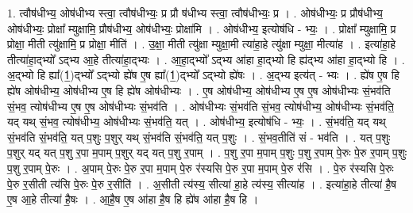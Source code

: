 \documentclass[17pt]{extarticle}
\begin{document}
1. त्वौष॑धीभ्य॒ ओष॑धीभ्य स्त्वा॒ त्वौष॑धीभ्यः॒ प्र प्रौ ष॑धीभ्य स्त्वा॒ त्वौष॑धीभ्यः॒ प्र । . ओष॑धीभ्यः॒ प्र प्रौष॑धीभ्य॒ ओष॑धीभ्यः॒ प्रोक्षा᳚ म्युक्षामि॒ प्रौष॑धीभ्य॒ ओष॑धीभ्यः॒ प्रोक्षा॑मि । . ओष॑धीभ्य॒ इत्योष॑धि - भ्यः॒ । . प्रोक्षा᳚ म्युक्षामि॒ प्र प्रोक्षा॒ मीती त्यु॑क्षामि॒ प्र प्रोक्षा॒ मीति॑ । . उ॒क्षा॒ मीती त्यु॑क्षा म्युक्षा॒मी त्या॑हा॒हे त्यु॑क्षा म्युक्षा॒ मीत्या॑ह । . इत्या॑हा॒हे तीत्या॑हा॒द्भ्यो᳚ ऽद्भ्य आ॒हे तीत्या॑हा॒द्भ्यः । . आ॒हा॒द्भ्यो᳚ ऽद्भ्य आ॑हा हा॒द्भ्यो हि ह्य॑द्भ्य आ॑हा हा॒द्भ्यो हि । . अ॒द्भ्यो हि ह्या᳚(1॒)द्भ्यो᳚ ऽद्भ्यो ह्ये॑ष ए॒ष ह्या᳚(1॒)द्भ्यो᳚ ऽद्भ्यो ह्ये॑षः । . अ॒द्भ्य इत्य॑त् - भ्यः । . ह्ये॑ष ए॒ष हि ह्ये॑ष ओष॑धीभ्य॒ ओष॑धीभ्य ए॒ष हि ह्ये॑ष ओष॑धीभ्यः । . ए॒ष ओष॑धीभ्य॒ ओष॑धीभ्य ए॒ष ए॒ष ओष॑धीभ्यः सं॒भव॑ति सं॒भव॒ त्योष॑धीभ्य ए॒ष ए॒ष ओष॑धीभ्यः सं॒भव॑ति । . ओष॑धीभ्यः सं॒भव॑ति सं॒भव॒ त्योष॑धीभ्य॒ ओष॑धीभ्यः सं॒भव॑ति॒ यद् यथ् सं॒भव॒ त्योष॑धीभ्य॒ ओष॑धीभ्यः सं॒भव॑ति॒ यत् । . ओष॑धीभ्य॒ इत्योष॑धि - भ्यः॒ । . सं॒भव॑ति॒ यद् यथ् सं॒भव॑ति सं॒भव॑ति॒ यत् प॒शुः प॒शुर् यथ् सं॒भव॑ति सं॒भव॑ति॒ यत् प॒शुः । . सं॒भव॒तीति॑ सं - भव॑ति । . यत् प॒शुः प॒शुर् यद् यत् प॒शु र॒पा म॒पाम् प॒शुर् यद् यत् प॒शु र॒पाम् । . प॒शु र॒पा म॒पाम् प॒शुः प॒शु र॒पाम् पे॒रुः पे॒रु र॒पाम् प॒शुः प॒शु र॒पाम् पे॒रुः । . अ॒पाम् पे॒रुः पे॒रु र॒पा म॒पाम् पे॒रु र॑स्यसि पे॒रु र॒पा म॒पाम् पे॒रु र॑सि । . पे॒रु र॑स्यसि पे॒रुः पे॒रु र॒सीती त्य॑सि पे॒रुः पे॒रु र॒सीति॑ । . अ॒सीती त्य॑स्य॒ सीत्या॑ हा॒हे त्य॑स्य॒ सीत्या॑ह । . इत्या॑हा॒हे तीत्या॑ है॒ष ए॒ष आ॒हे तीत्या॑ है॒षः । . आ॒है॒ष ए॒ष आ॑हा है॒ष हि ह्ये॑ष आ॑हा है॒ष हि । \newline
\end{document}
